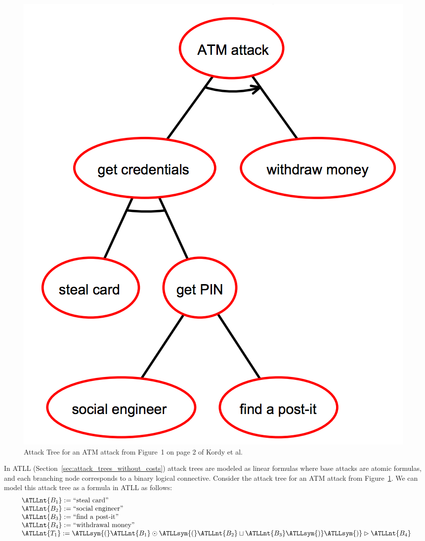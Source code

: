\begin{figure}
  \vspace{-30px}
  \begin{center}
    \includegraphics[scale=0.225]{ATM-Tree1}
  \end{center}  
  \label{fig:atm-tree1}
  \caption{Attack Tree for an ATM attack from Figure~1 on page 2 of Kordy et al.~\cite{Kordy2017}}
  \vspace{-55px}
\end{figure}
In ATLL (Section~\ref{sec:attack_trees_without_costs}) attack trees
are modeled as linear formulas where base attacks are atomic formulas,
and each branching node corresponds to a binary logical connective.
Consider the attack tree for an ATM attack from
Figure~\ref{fig:atm-tree1}.  We can model this attack tree as a
formula in ATLL as follows:
\[
\begin{array}{lll}
  \ATLLnt{B_{{\mathrm{1}}}} := \text{``steal card''}\\
  \ATLLnt{B_{{\mathrm{2}}}} := \text{``social engineer''}\\
  \ATLLnt{B_{{\mathrm{3}}}} := \text{``find a post-it''}\\
  \ATLLnt{B_{{\mathrm{4}}}} := \text{``withdrawal money''}\\
  \ATLLnt{T_{{\mathrm{1}}}} := \ATLLsym{(}  \ATLLnt{B_{{\mathrm{1}}}}  \odot  \ATLLsym{(}  \ATLLnt{B_{{\mathrm{2}}}}  \sqcup  \ATLLnt{B_{{\mathrm{3}}}}  \ATLLsym{)}  \ATLLsym{)}  \rhd  \ATLLnt{B_{{\mathrm{4}}}}
\end{array}
\]
